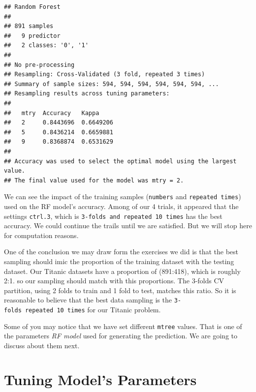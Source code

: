 \documentclass[
]{book}
\begin{document}
\begin{verbatim}
## Random Forest 
## 
## 891 samples
##   9 predictor
##   2 classes: '0', '1' 
## 
## No pre-processing
## Resampling: Cross-Validated (3 fold, repeated 3 times) 
## Summary of sample sizes: 594, 594, 594, 594, 594, 594, ... 
## Resampling results across tuning parameters:
## 
##   mtry  Accuracy   Kappa    
##   2     0.8443696  0.6649206
##   5     0.8436214  0.6659881
##   9     0.8368874  0.6531629
## 
## Accuracy was used to select the optimal model using the largest value.
## The final value used for the model was mtry = 2.
\end{verbatim}

We can see the impact of the training samples (\texttt{numbers} and \texttt{repeated\ times}) used on the RF model's accuracy. Among of our 4 trials, it appeared that the settings \texttt{ctrl.3}, which is \texttt{3-folds\ and\ repeated\ 10\ times} has the best accuracy. We could continue the trails until we are satisfied. But we will stop here for computation reasons.

One of the conclusion we may draw form the exercises we did is that the best sampling should imic the proportion of the training dataset with the testing dataset. Our Titanic datasets have a proportion of (891:418), which is roughly 2:1. so our sampling should match with this proportions. The 3-folds CV partition, using 2 folds to train and 1 fold to test, matches this ratio. So it is reasonable to believe that the best data sampling is the \texttt{3-folds\ repeated\ 10\ times} for our Titanic problem.

Some of you may notice that we have set different \texttt{mtree} values. That is one of the parameters \emph{RF model} used for generating the prediction. We are going to discuss about them next.

\hypertarget{tuning-models-parameters}{%
\section{Tuning Model's Parameters}\label{tuning-models-parameters}}
\end{document}
